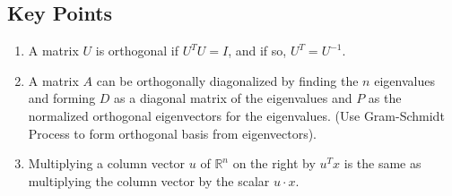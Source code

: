 \documentclass{article}
\begin{document}
\subsection*{Key Points}
\begin{enumerate}
    \item A matrix $U$ is orthogonal if $U^T U = I$, and if so, $U^T=U^{-1}$.
    \item A matrix $A$ can be orthogonally diagonalized by finding the $n$ eigenvalues and forming
    $D$ as a diagonal matrix of the eigenvalues and $P$ as the normalized orthogonal eigenvectors
    for the eigenvalues. (Use Gram-Schmidt Process to form orthogonal basis from eigenvectors).
    \item Multiplying a column vector $u$ of $\mathbb{R}^n$ on the right by $u^T x$ is the same as
    multiplying the column vector by the scalar $u\cdot x$.
\end{enumerate}
\end{document}
